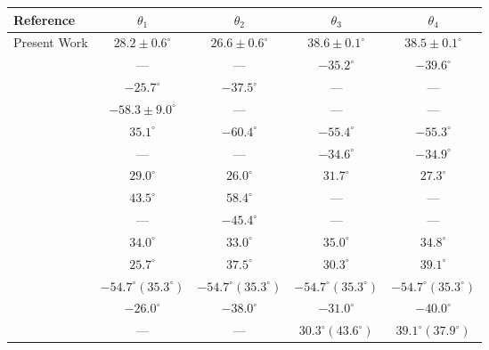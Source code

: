 \documentclass[prd,a4paper,preprint,preprintnumbers,nofootinbib,superscriptaddress]{revtex4-2}
\begin{document}
\begin{table}[hbt]
\centering
\begin{adjustbox}{center}
\renewcommand{\arraystretch}{1.2}
\setlength{\tabcolsep}{6pt}
\begin{tabular}{lcccc}
\toprule
Reference & $\theta_1$ & $\theta_2$ & $\theta_3$ & $\theta_4$ \\
\midrule
Present Work            & $28.2 \pm 0.6^\circ$ & $26.6 \pm 0.6^\circ$ & $38.6 \pm 0.1^\circ$ & $38.5 \pm 0.1^\circ$ \\
\cite{li:2021hss}       & ---                  & ---                  & $-35.2^\circ$        & $-39.6^\circ$        \\
\cite{Godfrey:2015dva}  & $-25.7^\circ$        & $-37.5^\circ$        & ---                  & ---                  \\
\cite{Wang:2022tuy}     & $-58.3 \pm 9.0^\circ$& ---                  & --- & ---                  \\
\cite{Li:2018eqc}       & $35.1^\circ$         & $-60.4^\circ$        & $-55.4^\circ$        & $-55.3^\circ$        \\
\cite{Lu:2016bbk}       & ---                  & ---                  & $-34.6^\circ$        & $-34.9^\circ$        \\
\cite{Gupta:1994mw}     & $29.0^\circ$         & $26.0^\circ$         & $31.7^\circ$         & $27.3^\circ$         \\
\cite{Vijande:2004he}   & $43.5^\circ$         & $58.4^\circ$         & ---                  & ---                  \\
\cite{Yamada:2005nu}    & ---                  & $-45.4^\circ$        & ---                  & ---                  \\
\cite{Abreu:2019adi}    & $34.0^\circ$         & $33.0^\circ$         & $35.0^\circ$         & $34.8^\circ$         \\
\cite{Ferretti:2015rsa} & $25.7^\circ$         & $37.5^\circ$         & $30.3^\circ$         & $39.1^\circ$         \\
\cite{Close:2005se}     & $-54.7^\circ (35.3^\circ)$ & $-54.7^\circ (35.3^\circ)$ & $-54.7^\circ (35.3^\circ)$ & $-54.7^\circ (35.3^\circ)$ \\
\cite{Godfrey:1986wj}   & $-26.0^\circ$        & $-38.0^\circ$        & $-31.0^\circ$        & $-40.0^\circ$        \\
\cite{Godfrey:2016nwn}  & ---                  & ---                  & $30.3^\circ (43.6^\circ)$ & $39.1^\circ (37.9^\circ)$ \\

\end{tabular}
\end{adjustbox}
\end{table}
\end{document}

